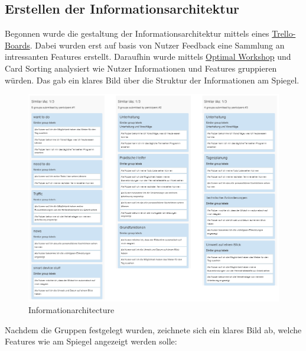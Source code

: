 \documentclass[12pt, a4paper]{scrartcl}
\begin{document}
	\subsection{Erstellen der Informationsarchitektur}
	Begonnen wurde die gestaltung der Informationsarchitektur mittels eines \href{https://trello.com/b/hdf8bWp2/sippin-on-my-lean-ux}{Trello-Boards}. Dabei wurden erst auf basis von Nutzer Feedback eine Sammlung an intressanten Features erstellt. Daraufhin wurde mittels \href{https://www.optimalworkshop.com/optimalsort/}{Optimal Workshop} und Card Sorting analysiert wie Nutzer Informationen und Features gruppieren würden. Das gab ein klares Bild über die Struktur der Informationen am Spiegel.
	\begin{figure}[h!]
		\centering
		\includegraphics[width=\textwidth]{img/IA.png}
		\captionsetup{labelformat=empty}
		\caption{Informationarchitecture}
	\end{figure}
	\newpage
	Nachdem die Gruppen festgelegt wurden, zeichnete sich ein klares Bild ab, welche Features wie am Spiegel angezeigt werden solle:
\end{document}
